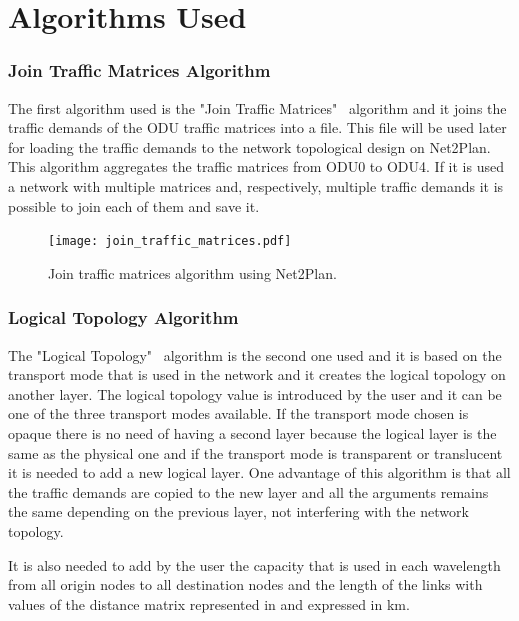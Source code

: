 \newpage

\section*{Algorithms Used}

\subsubsection{Join Traffic Matrices Algorithm}\label{join_traffic_matrices_algorithm}

\vspace{11pt}
The first algorithm used is the "Join Traffic Matrices" \ algorithm and it joins the traffic demands of the ODU traffic matrices into a file. This file will be used later for loading the traffic demands to the network topological design on Net2Plan. This algorithm aggregates the traffic matrices from ODU0 to ODU4. If it is used a network with multiple matrices and, respectively, multiple traffic demands it is possible to join each of them and save it.

\begin{figure}[H]
\centering
\texttt{[image: join\_traffic\_matrices.pdf]}
\caption{Join traffic matrices algorithm using Net2Plan.}
\label{join_traffic_matrices}
\end{figure}

\subsubsection{Logical Topology Algorithm}\label{logical_topology_algorithm}

\vspace{11pt}
The "Logical Topology" \ algorithm is the second one used and it is based on the transport mode that is used in the network and it creates the logical topology on another layer. The logical topology value is introduced by the user and it can be one of the three transport modes available. If the transport mode chosen is opaque there is no need of having a second layer because the logical layer is the same as the physical one and if the transport mode is transparent or translucent it is needed to add a new logical layer. One advantage of this algorithm is that all the traffic demands are copied to the new layer and all the arguments remains the same depending on the previous layer, not interfering with the network topology.

It is also needed to add by the user the capacity that is used in each wavelength from all origin nodes to all destination nodes and the length of the links with values of the distance matrix represented in \label{Reference_Network_Topology} and expressed in km.

